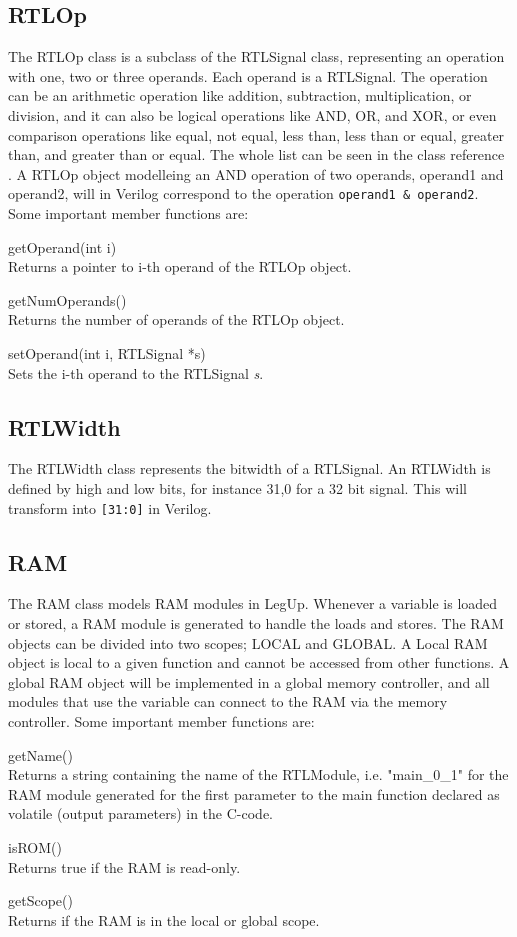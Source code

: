 \subsection{RTLOp}
The RTLOp class is a subclass of the RTLSignal class, representing an operation with one, two or three operands. Each operand is a RTLSignal. The operation can be an arithmetic operation like addition, subtraction, multiplication, or division, and it can also be logical operations like AND, OR, and XOR, or even comparison operations like equal, not equal, less than, less than or equal, greater than, and greater than or equal. The whole list can be seen in the class reference \cite{rtlopclassref}. A RTLOp object modelleing an AND operation of two operands, operand1 and operand2, will in Verilog correspond to the operation \verb!operand1 & operand2!. Some important member functions are:
\begin{compactdesc}
    \item[getOperand(int i)] \hfill \\
    Returns a pointer to i-th operand of the RTLOp object.
    \item[getNumOperands()] \hfill \\
    Returns the number of operands of the RTLOp object.
    \item[setOperand(int i, RTLSignal *s)] \hfill \\
    Sets the i-th operand to the RTLSignal \textit{s}.
\end{compactdesc}
\subsection{RTLWidth}
The RTLWidth class represents the bitwidth of a RTLSignal. An RTLWidth is defined by high and low bits, for instance 31,0 for a 32 bit signal. This will transform into \verb![31:0]! in Verilog.
\subsection{RAM}
The RAM class models RAM modules in LegUp. Whenever a variable is loaded or stored, a RAM module is generated to handle the loads and stores. The RAM objects can be divided into two scopes; LOCAL and GLOBAL. A Local RAM object is local to a given function and cannot be accessed from other functions. A global RAM object will be implemented in a global memory controller, and all modules that use the variable can connect to the RAM via the memory controller. Some important member functions are:
\begin{compactdesc}
    \item[getName()] \hfill \\
    Returns a string containing the name of the RTLModule, i.e. "main\_0\_1" for the RAM module generated for the first parameter to the main function declared as volatile (output parameters) in the C-code.
    \item[isROM()] \hfill \\
    Returns true if the RAM is read-only.
    \item[getScope()] \hfill \\
    Returns if the RAM is in the local or global scope.
\end{compactdesc}

